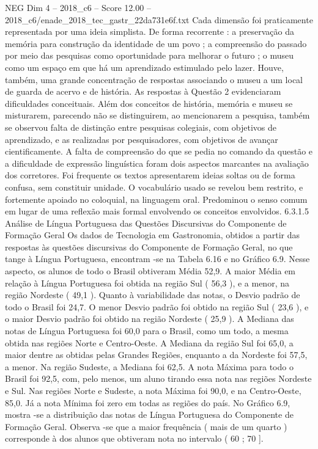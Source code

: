 \begin{textsample}{NEG Dim 4 – 2018\_c6 – Score 12.00 – 2018\_c6/enade\_2018\_tec\_gastr\_22da731e6f.txt}
Cada dimensão foi praticamente representada por uma ideia simplista.
De forma recorrente : a preservação da memória para construção da identidade de um povo ; a compreensão do passado por meio das pesquisas como oportunidade para melhorar o futuro ; o museu como um espaço em que há um aprendizado estimulado pelo lazer.
Houve, também, uma grande concentração de respostas associando o museu a um local de guarda de acervo e de história.
As respostas à Questão 2 evidenciaram dificuldades conceituais.
Além dos conceitos de história, memória e museu se misturarem, parecendo não se distinguirem, ao mencionarem a pesquisa, também se observou falta de distinção entre pesquisas colegiais, com objetivos de aprendizado, e as realizadas por pesquisadores, com objetivos de avançar cientificamente.
A falta de compreensão do que se pedia no comando da questão e a dificuldade de expressão linguística foram dois aspectos marcantes na avaliação dos corretores.
Foi frequente os textos apresentarem ideias soltas ou de forma confusa, sem constituir unidade.
O vocabulário usado se revelou bem restrito, e fortemente apoiado no coloquial, na linguagem oral.
Predominou o senso comum em lugar de uma reflexão mais formal envolvendo os conceitos envolvidos. 6.3.1.5 Análise de Língua Portuguesa das Questões Discursivas do Componente de Formação Geral Os dados de Tecnologia em Gastronomia, obtidos a partir das respostas às questões discursivas do Componente de Formação Geral, no que tange à Língua Portuguesa, encontram -se na Tabela 6.16 e no Gráfico 6.9.
Nesse aspecto, os alunos de todo o Brasil obtiveram Média 52,9.
A maior Média em relação à Língua Portuguesa foi obtida na região Sul ( 56,3 ), e a menor, na região Nordeste ( 49,1 ).
Quanto à variabilidade das notas, o Desvio padrão de todo o Brasil foi 24,7.
O menor Desvio padrão foi obtido na região Sul ( 23,6 ), e o maior Desvio padrão foi obtido na região Nordeste ( 25,9 ).
A Mediana das notas de Língua Portuguesa foi 60,0 para o Brasil, como um todo, a mesma obtida nas regiões Norte e Centro-Oeste.
A Mediana da região Sul foi 65,0, a maior dentre as obtidas pelas Grandes Regiões, enquanto a da Nordeste foi 57,5, a menor.
Na região Sudeste, a Mediana foi 62,5.
A nota Máxima para todo o Brasil foi 92,5, com, pelo menos, um aluno tirando essa nota nas regiões Nordeste e Sul.
Nas regiões Norte e Sudeste, a nota Máxima foi 90,0, e na Centro-Oeste, 85,0.
Já a nota Mínima foi zero em todas as regiões do país.
No Gráfico 6.9, mostra -se a distribuição das notas de Língua Portuguesa do Componente de Formação Geral.
Observa -se que a maior frequência ( mais de um quarto ) corresponde à dos alunos que obtiveram nota no intervalo ( 60 ; 70 ].

\end{textsample}
